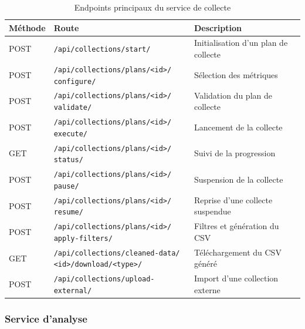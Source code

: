 \begin{table}[H]
\centering
\small
\caption{Endpoints principaux du service de collecte}
\label{tab:endpoints-collection}
\begin{tabular}{|>{\centering\arraybackslash}p{1.5cm}
                |>{\raggedright\arraybackslash}p{7.2cm}
                |>{\raggedright\arraybackslash}p{3.8cm}|}
\hline
\textbf{Méthode} & \textbf{Route} & \textbf{Description} \\
\hline
POST & \texttt{/api/collections/start/} & Initialisation d'un plan de collecte \\
\hline
POST & \makecell[l]{\texttt{/api/collections/plans/<id>/} \\ \texttt{configure/}} & Sélection des métriques \\
\hline
POST & \makecell[l]{\texttt{/api/collections/plans/<id>/} \\ \texttt{validate/}} & Validation du plan de collecte \\
\hline
POST & \makecell[l]{\texttt{/api/collections/plans/<id>/} \\ \texttt{execute/}} & Lancement de la collecte \\
\hline
GET & \makecell[l]{\texttt{/api/collections/plans/<id>/} \\ \texttt{status/}} & Suivi de la progression \\
\hline
POST & \makecell[l]{\texttt{/api/collections/plans/<id>/} \\ \texttt{pause/}} & Suspension de la collecte \\
\hline
POST & \makecell[l]{\texttt{/api/collections/plans/<id>/} \\ \texttt{resume/}} & Reprise d'une collecte suspendue \\
\hline
POST & \makecell[l]{\texttt{/api/collections/plans/<id>/} \\ \texttt{apply-filters/}} & Filtres et génération du CSV \\
\hline
GET & \makecell[l]{\texttt{/api/collections/cleaned-data/} \\ \texttt{<id>/download/<type>/}} & Téléchargement du CSV généré \\
\hline
POST & \texttt{/api/collections/upload-external/} & Import d'une collection externe \\
\hline
\end{tabular}
\end{table}

\subsubsection{Service d'analyse}

